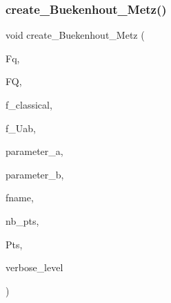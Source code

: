 \mbox{\label{_t_o_p___l_e_v_e_l_2projective__space_8_c_a78309855776389326c2be56b2c5c1f0c}} 
\subsubsection{\texorpdfstring{create\+\_\+\+Buekenhout\+\_\+\+Metz()}{create\_Buekenhout\_Metz()}}
{\footnotesize\ttfamily void create\+\_\+\+Buekenhout\+\_\+\+Metz (\begin{DoxyParamCaption}\item[{\mbox{\hyperlink{classfinite__field}{finite\+\_\+field}} $\ast$}]{Fq,  }\item[{\mbox{\hyperlink{classfinite__field}{finite\+\_\+field}} $\ast$}]{FQ,  }\item[{\mbox{\hyperlink{galois_8h_a09fddde158a3a20bd2dcadb609de11dc}{I\+NT}}}]{f\+\_\+classical,  }\item[{\mbox{\hyperlink{galois_8h_a09fddde158a3a20bd2dcadb609de11dc}{I\+NT}}}]{f\+\_\+\+Uab,  }\item[{\mbox{\hyperlink{galois_8h_a09fddde158a3a20bd2dcadb609de11dc}{I\+NT}}}]{parameter\+\_\+a,  }\item[{\mbox{\hyperlink{galois_8h_a09fddde158a3a20bd2dcadb609de11dc}{I\+NT}}}]{parameter\+\_\+b,  }\item[{\mbox{\hyperlink{galois_8h_ab6cc7b4aeb6ea31aba2b3fbfc83ff5e6}{B\+Y\+TE}} $\ast$}]{fname,  }\item[{\mbox{\hyperlink{galois_8h_a09fddde158a3a20bd2dcadb609de11dc}{I\+NT}} \&}]{nb\+\_\+pts,  }\item[{\mbox{\hyperlink{galois_8h_a09fddde158a3a20bd2dcadb609de11dc}{I\+NT}} $\ast$\&}]{Pts,  }\item[{\mbox{\hyperlink{galois_8h_a09fddde158a3a20bd2dcadb609de11dc}{I\+NT}}}]{verbose\+\_\+level }\end{DoxyParamCaption})}

\mbox{\label{_t_o_p___l_e_v_e_l_2projective__space_8_c_ad7fc0ff2bf8455ab25e170c6930047a6}} 
